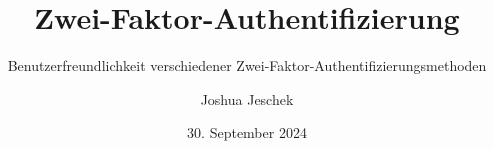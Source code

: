 \newcommand{\organization}{
    Technische Universität Chemnitz \\
    Fakultät Informatik \\
    Professur Medieninformatik \\
}
\newcommand{\type}{Hauptseminar}
\newcommand{\theauthor}{Joshua Jeschek}
\newcommand{\thetitle}{Zwei-Faktor-Authentifizierung}
\newcommand{\thesubtitle}{Benutzerfreundlichkeit verschiedener Zwei-Faktor-Authentifizierungsmethoden}
\newcommand{\pruefer}{Dr. Thomas Wilhelm-Stein}
\newcommand{\place}{München}
\date{30. September 2024}

\author{\theauthor}
\title{\thetitle}
\subtitle{\thesubtitle}
